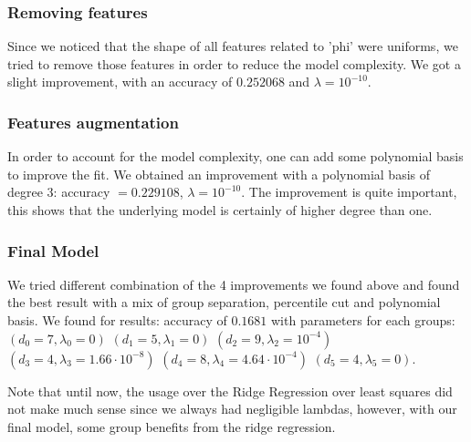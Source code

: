\documentclass[10pt,conference,compsocconf]{IEEEtran}
\begin{document}
\subsubsection{Removing features}
Since we noticed that the shape of all features related to 'phi' were uniforms,
we tried to remove those features in order to reduce the model complexity. We
got a slight improvement, with an accuracy of $0.252068$ and $\lambda =
10^{-10}$.

\subsubsection{Features augmentation}
In order to account for the model complexity, one can add some polynomial basis
to improve the fit. We obtained an improvement with a polynomial basis of degree
3: accuracy $= 0.229108$, $\lambda = 10^{-10}$. The improvement is quite
important, this shows that the underlying model is certainly of higher degree
than one.

\subsubsection{Final Model}
We tried different combination of the 4 improvements we found above and found
the best result with a mix of group separation, percentile cut and polynomial
basis. We found for results: accuracy of $0.1681$ with parameters for each groups:
$(d_0 = 7, \lambda_0 = 0)$
$(d_1 = 5, \lambda_1 = 0)$
$(d_2 = 9, \lambda_2 = 10^{-4})$
$(d_3 = 4, \lambda_3 = 1.66 \cdot 10^{-8})$
$(d_4 = 8, \lambda_4 = 4.64 \cdot 10^{-4})$
$(d_5 = 4, \lambda_5 = 0)$.

Note that until now, the usage over the Ridge Regression over least squares did
not make much sense since we always had negligible lambdas, however, with our
final model, some group benefits from the ridge regression.
\end{document}
